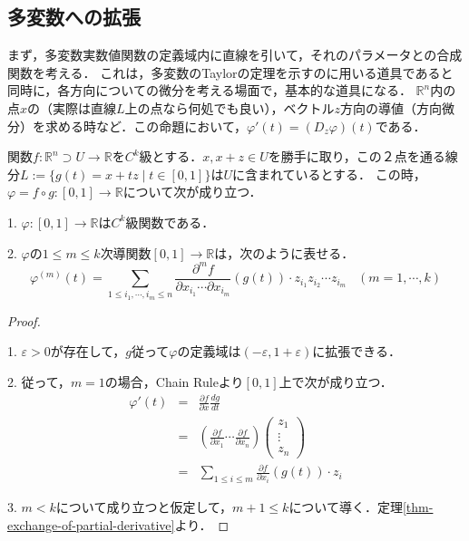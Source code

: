 \documentclass[uplatex, dvipdfmx]{jsreport}
\begin{document}
\subsection{多変数への拡張}

まず，多変数実数値関数の定義域内に直線を引いて，それのパラメータとの合成関数を考える．
これは，多変数のTaylorの定理を示すのに用いる道具であると同時に，各方向についての微分を考える場面で，基本的な道具になる．
$\mathbb{R}^n$内の点$x$の（実際は直線$L$上の点なら何処でも良い），ベクトル$z$方向の導値（方向微分）を求める時など．この命題において，$\varphi'(t)=(D_z\varphi)(t)$である．
\begin{proposition}
    関数$f:\mathbb{R}^n\supset U\to\mathbb{R}$を$C^k$級とする．$x,x+z\in U$を勝手に取り，この２点を通る線分$L:=\{g(t)=x+tz\mid t\in [0,1]\}$は$U$に含まれているとする．
    この時，$\varphi=f\circ g:[0,1]\to\mathbb{R}$について次が成り立つ．
    
    1. $\varphi:[0,1]\to\mathbb{R}$は$C^k$級関数である．

    2. $\varphi$の$1\le m\le k$次導関数$[0,1]\to\mathbb{R}$は，次のように表せる．
    \[ \varphi^{(m)}(t) = \sum_{1\le i_1,\cdots,i_m\le n}\frac{\partial^m f}{\partial x_{i_1}\cdots\partial x_{i_m}}(g(t))\cdot z_{i_1}z_{i_2}\cdots z_{i_m}\;\;\; (m=1,\cdots,k) \]

\end{proposition}
\begin{proof}　

    1. $\varepsilon>0$が存在して，$g$従って$\varphi$の定義域は$(-\varepsilon,1+\varepsilon)$に拡張できる．

    2. 従って，$m=1$の場合，Chain Ruleより$[0,1]$上で次が成り立つ．
    \begin{eqnarray*} \varphi'(t) &=& \frac{\partial f}{\partial x}\frac{d g}{dt} \\
        &=& (\frac{\partial f}{\partial x_1} \cdots \frac{\partial f}{\partial x_n})\left(\begin{array}{c}z_1 \\ \vdots \\ z_n\end{array}\right) \\
        &=& \sum_{1\le i\le m} \frac{\partial f}{\partial x_i}(g(t))\cdot z_i
    \end{eqnarray*}
    
    3. $m<k$について成り立つと仮定して，$m+1\le k$について導く．定理\ref{thm-exchange-of-partial-derivative}より．
\end{proof}
\end{document}

